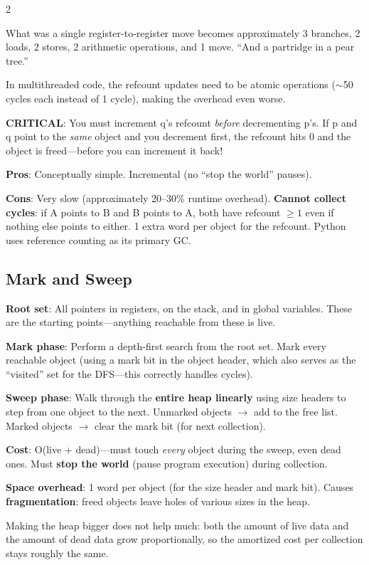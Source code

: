 \documentclass[9pt,landscape]{extarticle}
\begin{document}
\begin{multicols}{2}
\begin{exambox}[{Worked Example: Code Generated for p = q with Reference Counting}]
What was a single register-to-register move becomes approximately 3 branches, 2 loads, 2 stores, 2 arithmetic operations, and 1 move. ``And a partridge in a pear tree.''

In multithreaded code, the refcount updates need to be atomic operations ($\sim$50 cycles each instead of 1 cycle), making the overhead even worse.

\textbf{CRITICAL}: You must increment q's refcount \emph{before} decrementing p's. If p and q point to the \emph{same} object and you decrement first, the refcount hits 0 and the object is freed---before you can increment it back!
\end{exambox}

\textbf{Pros}: Conceptually simple. Incremental (no ``stop the world'' pauses).

\textbf{Cons}: Very slow (approximately 20--30\% runtime overhead). \textbf{Cannot collect cycles}: if A points to B and B points to A, both have refcount $\geq 1$ even if nothing else points to either. 1 extra word per object for the refcount. Python uses reference counting as its primary GC.

\subsection{Mark and Sweep}

\textbf{Root set}: All pointers in registers, on the stack, and in global variables. These are the starting points---anything reachable from these is live.

\textbf{Mark phase}: Perform a depth-first search from the root set. Mark every reachable object (using a mark bit in the object header, which also serves as the ``visited'' set for the DFS---this correctly handles cycles).

\textbf{Sweep phase}: Walk through the \textbf{entire heap linearly} using size headers to step from one object to the next. Unmarked objects $\to$ add to the free list. Marked objects $\to$ clear the mark bit (for next collection).

\textbf{Cost}: O(live + dead)---must touch \emph{every} object during the sweep, even dead ones. Must \textbf{stop the world} (pause program execution) during collection.

\textbf{Space overhead}: 1 word per object (for the size header and mark bit). Causes \textbf{fragmentation}: freed objects leave holes of various sizes in the heap.

Making the heap bigger does not help much: both the amount of live data and the amount of dead data grow proportionally, so the amortized cost per collection stays roughly the same.


\end{multicols}
\end{document}
